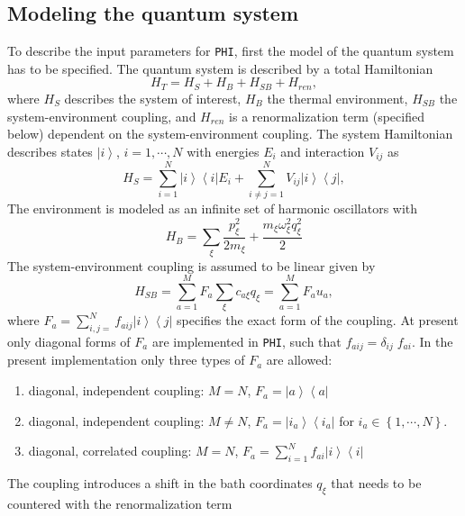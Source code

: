 \documentclass[11pt]{article}
\newcommand{\PHI}{\texttt{PHI}}
\newcommand{\ket}[1]{{\left| #1 \right>}}
\newcommand{\bra}[1]{{\left< #1 \right|}}
\newcommand{\ketbra}[2]{{\ket{#1}\bra{#2}}}
\begin{document}
\subsection{Modeling the quantum system}
To describe the input parameters for \PHI, first the model of the quantum system has to be specified.
The quantum system is described by a total Hamiltonian 
\begin{equation}
H_T = H_S + H_B + H_{SB}  + H_{ren},
\end{equation}
where $H_S$ describes the system of interest, $H_B$ the thermal environment, $H_{SB}$ the system-environment coupling, and $H_{ren}$ is a renormalization term (specified below) dependent on the system-environment coupling. 
The system Hamiltonian describes states $\ket{i}$, $i=1,\cdots,N$ with energies $E_i$ and interaction $V_{ij}$ as
\begin{equation}
H_S  = \sum_{i=1}^N \ket{i}\bra{i} E_i + \sum_{i\ne j=1}^{N} V_{ij}\ket{i}\bra{j},
\end{equation}
The environment is modeled as an infinite set of harmonic oscillators with
\begin{equation}
H_B = \sum_\xi \frac{p_\xi^2}{2m_\xi} + \frac{m_\xi\omega_\xi^2q_\xi^2}{2}
\end{equation}
The system-environment coupling is assumed to be linear given by
\begin{equation}
H_{SB} = \sum_{a=1}^M F_a \sum_\xi c_{a\xi}q_\xi = \sum_{a=1}^M F_a u_a,
\end{equation}
where $F_a = \sum_{i,j=}^N f_{aij} \ketbra{i}{j} $ specifies the exact form of the coupling. At present only diagonal forms of $F_a$ are implemented in \PHI, such that $ {f_{aij} = \delta_{ij}\;f_{ai}} $. In the present implementation only three types of $F_a$ are allowed:
\begin{enumerate}
\item diagonal, independent coupling: $M=N$, $F_a=\ketbra{a}{a}$
\item diagonal, independent coupling: $M\ne N$, $F_a =  \ketbra{i_a}{i_a}$ for $i_a \in \left\{1,\cdots,N\right\}$.
\item diagonal, correlated coupling:    $M=N$, $F_a = \sum_{i=1}^N f_{ai}\ketbra{i}{i}$
\end{enumerate}
The coupling introduces a shift in the bath coordinates $q_\xi$ that needs to be countered with the renormalization term 
\end{document}

